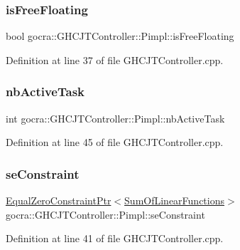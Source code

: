 \subsubsection{\texorpdfstring{is\+Free\+Floating}{isFreeFloating}}
{\footnotesize\ttfamily bool gocra\+::\+G\+H\+C\+J\+T\+Controller\+::\+Pimpl\+::is\+Free\+Floating}



Definition at line 37 of file G\+H\+C\+J\+T\+Controller.\+cpp.

\hypertarget{structgocra_1_1GHCJTController_1_1Pimpl_acc8e0872a4a56af752e5556f8b5c83d5}{}\label{structgocra_1_1GHCJTController_1_1Pimpl_acc8e0872a4a56af752e5556f8b5c83d5} 
\subsubsection{\texorpdfstring{nb\+Active\+Task}{nbActiveTask}}
{\footnotesize\ttfamily int gocra\+::\+G\+H\+C\+J\+T\+Controller\+::\+Pimpl\+::nb\+Active\+Task}



Definition at line 45 of file G\+H\+C\+J\+T\+Controller.\+cpp.

\hypertarget{structgocra_1_1GHCJTController_1_1Pimpl_abbc7f37d47e968b025652ade01739ab8}{}\label{structgocra_1_1GHCJTController_1_1Pimpl_abbc7f37d47e968b025652ade01739ab8} 
\subsubsection{\texorpdfstring{se\+Constraint}{seConstraint}}
{\footnotesize\ttfamily \hyperlink{classocra_1_1EqualZeroConstraintPtr}{Equal\+Zero\+Constraint\+Ptr}$<$\hyperlink{classocra_1_1SumOfLinearFunctions}{Sum\+Of\+Linear\+Functions}$>$ gocra\+::\+G\+H\+C\+J\+T\+Controller\+::\+Pimpl\+::se\+Constraint}



Definition at line 41 of file G\+H\+C\+J\+T\+Controller.\+cpp.

\hypertarget{structgocra_1_1GHCJTController_1_1Pimpl_a949ca96a7b5a333e0594c6e6eda106a1}{}\label{structgocra_1_1GHCJTController_1_1Pimpl_a949ca96a7b5a333e0594c6e6eda106a1} 

